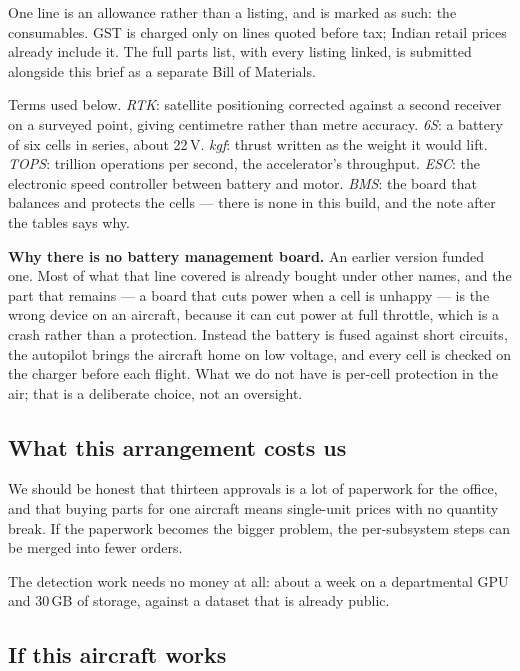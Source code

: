 \documentclass[11pt,a4paper]{article}
\begin{document}
One line is an allowance rather than a listing, and is marked as such: the
consumables. GST is charged only on lines
quoted before tax; Indian retail prices already include it. The full parts list, with every listing linked, is submitted alongside this brief as a separate Bill of Materials.

Terms used below. \emph{RTK}: satellite positioning corrected against
a second receiver on a surveyed point, giving centimetre rather than metre
accuracy. \emph{6S}: a battery of six cells in series, about 22\,V. \emph{kgf}: thrust written as the weight it would lift.
\emph{TOPS}: trillion operations per second, the accelerator's throughput.
\emph{ESC}: the electronic speed controller between battery and motor.
\emph{BMS}: the board that balances and protects the cells --- there is none
in this build, and the note after the tables says why.



\textbf{Why there is no battery management board.} An earlier version funded
one. Most of what that line covered is already bought under other names, and
the part that remains --- a board that cuts power when a cell is unhappy --- is
the wrong device on an aircraft, because it can cut power at full throttle,
which is a crash rather than a protection. Instead the battery is fused against
short circuits, the autopilot brings the aircraft home on low voltage, and
every cell is checked on the charger before each flight. What we do not have is
per-cell protection in the air; that is a deliberate choice, not an oversight.

\subsection{What this arrangement costs us}

We should be honest that thirteen approvals is a lot of paperwork for the
office, and that buying parts for one aircraft means single-unit prices with no
quantity break. If the paperwork becomes the bigger problem, the per-subsystem
steps can be merged into fewer orders.

The detection work needs no money at all: about a week on a departmental GPU
and 30\,GB of storage, against a dataset that is already public.

\subsection{If this aircraft works}
\end{document}
